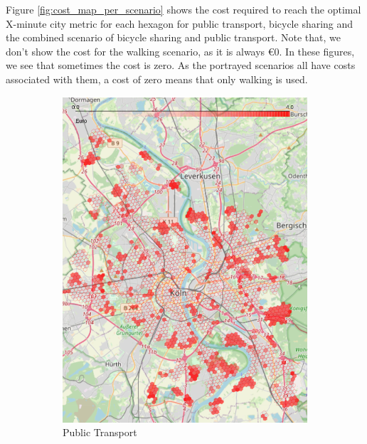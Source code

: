 Figure \ref{fig:cost_map_per_scenario} shows the cost required to reach the optimal X-minute city metric for each hexagon for public transport, bicycle sharing and the combined scenario of bicycle sharing and public transport.
Note that, we don't show the cost for the walking scenario, as it is always \euro{0}.
In these figures, we see that sometimes the cost is zero.
As the portrayed scenarios all have costs associated with them, a cost of zero means that only walking is used.
\begin{figure}
     \centering
     \begin{subfigure}[b]{0.3\textwidth}
         \centering
         \includegraphics[width=\textwidth]{Figures/results/cost/public_transport_cost_map}
         \caption{Public Transport}
         \label{fig:public_transport_cost_map}
     \end{subfigure}
     \hfill
     \begin{subfigure}[b]{0.3\textwidth}
         \centering

\end{subfigure}
\end{figure}
